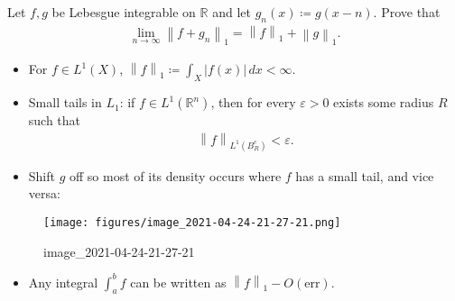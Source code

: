 Let \(f, g\) be Lebesgue integrable on \({\mathbb{R}}\) and let
\(g_n(x) \coloneqq g(x- n)\). Prove that
\begin{align*}
\lim_{n\to \infty } {\left\lVert {f + g_n} \right\rVert}_1 = {\left\lVert {f} \right\rVert}_1 + {\left\lVert {g} \right\rVert}_1
.\end{align*}

\begin{concept}

\envlist

\begin{itemize}
\item
  For \(f\in L^1(X)\),
  \({\left\lVert {f} \right\rVert}_1 \coloneqq\int_X {\left\lvert {f(x)} \right\rvert} \,dx< \infty\).
\item
  Small tails in \(L_1\): if \(f\in L^1({\mathbb{R}}^n)\), then for
  every \(\varepsilon>0\) exists some radius \(R\) such that
  \begin{align*}
  {\left\lVert {f} \right\rVert}_{L^1(B_R^c)} < \varepsilon
  .\end{align*}
\item
  Shift \(g\) off so most of its density occurs where \(f\) has a small
  tail, and vice versa:
\end{itemize}

\begin{figure}
\centering
\texttt{[image: figures/image\_2021-04-24-21-27-21.png]}
\caption{image\_2021-04-24-21-27-21}
\end{figure}

\begin{itemize}
\tightlist
\item
  Any integral \(\int_a^b f\) can be written as
  \({\left\lVert {f} \right\rVert}_1 - O(\text{err})\).
\end{itemize}

\end{concept}

